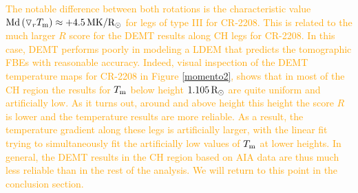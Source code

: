 \documentclass[namedreferences]{solarphysics}
\newcommand{\mrsun}{{\rm R_\odot}}
\newcommand{\MK}{{\rm MK}}
\newcommand{\dr}{\triangledown_r}
\newcommand{\Tm}{T_{\rm m}}
\def\albert#1{\textcolor{orange}{#1}}
\def\temp#1{\textcolor{gray}{#1}}
\begin{document}
\begin{article}
\albert{The notable difference between both rotations is the characteristic \albert{value ${\rm Md}\left(\dr\Tm\right)\approx +4.5\,\MK/\mrsun$} for legs of type III for CR-2208. This is related to the much larger $R$ score for the DEMT results along CH legs for CR-2208. In this case, DEMT performs poorly in modeling a LDEM that predicts the tomographic FBEs with reasonable accuracy. Indeed, visual inspection of the DEMT temperature maps for CR-2208 in Figure \ref{momento2}, shows that in most of the CH region the results for $\Tm$ below height $1.105\,\mrsun$ are quite uniform and artificially low. As it turns out, around and above height this height the score $R$ is lower and the temperature results are more reliable. As a result, the temperature gradient along these legs is artificially larger, with the linear fit trying to simultaneously fit the artificially low values of $\Tm$ at lower heights. In general, the DEMT results in the CH region based on AIA data are thus much less reliable than in the rest of the analysis. We will return to this point in the conclusion section.}




\end{article}
\end{document}
